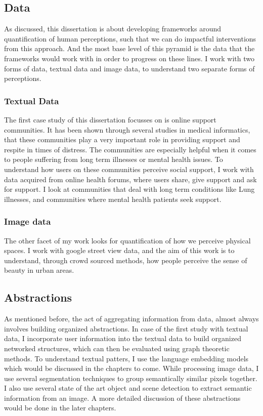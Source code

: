 \subsection{Data}
As discussed, this dissertation is about developing frameworks around quantification of human perceptions, such that we can do impactful interventions from this approach. And the most base level of this pyramid is the data that the frameworks would work with in order to progress on these lines. I work with two forms of data, textual data and image data, to understand two separate forms of perceptions. 

\subsubsection{Textual Data}
The first case study of this dissertation focusses on is online support communities. It has been shown through several studies in medical informatics, that these communities play a very important role in providing support and respite in times of distress. The communities are especially helpful when it comes to people suffering from long term illnesses or mental health issues. 
To understand how users on these communities perceive social support, I work with data acquired from online health forums, where users share, give support and ask for support. I look at communities that deal with long term conditions like Lung illnesses, and communities where mental health patients seek support. 

\subsubsection{Image data}
The other facet of my work looks for quantification of how we perceive physical spaces. I work with google street view data, and the aim of this work is to understand, through crowd sourced methods, how people perceive the sense of beauty in urban areas. 

\subsection{Abstractions}
As mentioned before, the act of aggregating information from data, almost always involves building organized abstractions. In case of the first study with textual data, I incorporate user information into the textual data to build organized networked structures, which can then be evaluated using graph theoretic methods. To understand textual patters, I use the language embedding models which would be discussed in the chapters to come. 
While processing image data, I use several segmentation techniques to group semantically similar pixels together. I also use several state of the art object and scene detection to extract semantic information from an image. A more detailed discussion of these abstractions would be done in the later chapters.  

